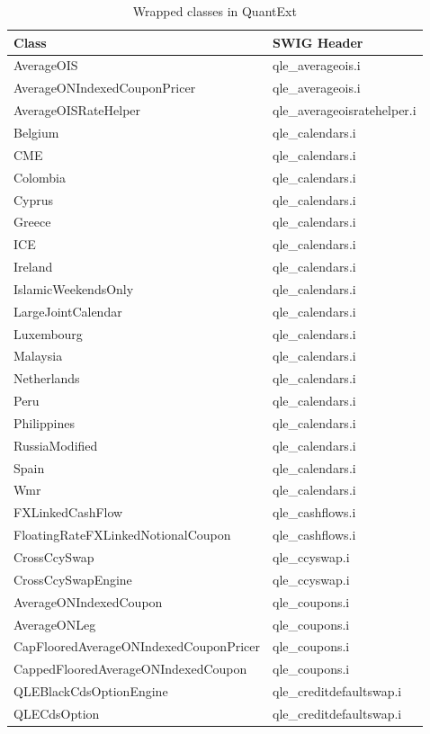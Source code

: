\documentclass[12pt, a4paper]{report}
\begin{document}
\begin{appendix}
{
\scriptsize
\begin{longtable}{|l|l|}
\caption{Wrapped classes in QuantExt \\ \vspace{0.5cm}} \\
\hline
Class & SWIG Header \\
\hline
AverageOIS & qle\_averageois.i \\
AverageONIndexedCouponPricer & qle\_averageois.i \\
AverageOISRateHelper & qle\_averageoisratehelper.i \\
Belgium & qle\_calendars.i \\
CME & qle\_calendars.i \\
Colombia & qle\_calendars.i \\
Cyprus & qle\_calendars.i \\
Greece & qle\_calendars.i \\
ICE & qle\_calendars.i \\
Ireland & qle\_calendars.i \\
IslamicWeekendsOnly & qle\_calendars.i \\
LargeJointCalendar & qle\_calendars.i \\
Luxembourg & qle\_calendars.i \\
Malaysia & qle\_calendars.i \\
Netherlands & qle\_calendars.i \\
Peru & qle\_calendars.i \\
Philippines & qle\_calendars.i \\
RussiaModified & qle\_calendars.i \\
Spain & qle\_calendars.i \\
Wmr & qle\_calendars.i \\
FXLinkedCashFlow & qle\_cashflows.i \\
FloatingRateFXLinkedNotionalCoupon & qle\_cashflows.i \\
CrossCcySwap & qle\_ccyswap.i \\
CrossCcySwapEngine & qle\_ccyswap.i \\
AverageONIndexedCoupon & qle\_coupons.i \\
AverageONLeg & qle\_coupons.i \\
CapFlooredAverageONIndexedCouponPricer & qle\_coupons.i \\
CappedFlooredAverageONIndexedCoupon & qle\_coupons.i \\
QLEBlackCdsOptionEngine & qle\_creditdefaultswap.i \\
QLECdsOption & qle\_creditdefaultswap.i \\

\end{longtable}}
\end{appendix}
\end{document}
